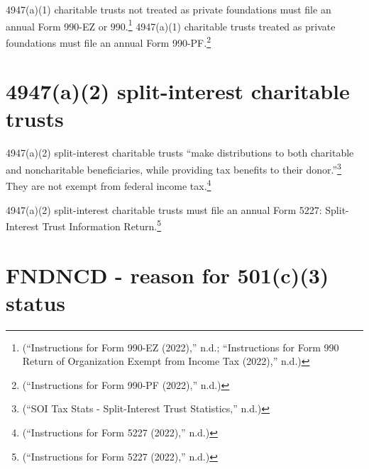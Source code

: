 \documentclass[
  letterpaper,
  DIV=11,
  numbers=noendperiod]{scrreprt}
\begin{document}
4947(a)(1) charitable trusts not treated as private foundations must
file an annual Form 990-EZ or 990.\footnote{({``Instructions for Form
  990-EZ (2022),''} n.d.; {``Instructions for Form 990 Return of
  Organization Exempt from Income Tax (2022),''} n.d.)} 4947(a)(1)
charitable trusts treated as private foundations must file an annual
Form 990-PF.\footnote{({``Instructions for Form 990-PF (2022),''} n.d.)}

\hypertarget{a2-split-interest-charitable-trusts}{%
\section{4947(a)(2) split-interest charitable
trusts}\label{a2-split-interest-charitable-trusts}}

4947(a)(2) split-interest charitable trusts ``make distributions to both
charitable and noncharitable beneficiaries, while providing tax benefits
to their donor.''\footnote{({``SOI Tax Stats - Split-Interest Trust
  Statistics,''} n.d.)} They are not exempt from federal income
tax.\footnote{({``Instructions for Form 5227 (2022),''} n.d.)}

4947(a)(2) split-interest charitable trusts must file an annual Form
5227: Split-Interest Trust Information Return.\footnote{({``Instructions
  for Form 5227 (2022),''} n.d.)}

\hypertarget{fndncd---reason-for-501c3-status}{%
\section{FNDNCD - reason for 501(c)(3)
status}\label{fndncd---reason-for-501c3-status}}
\end{document}
